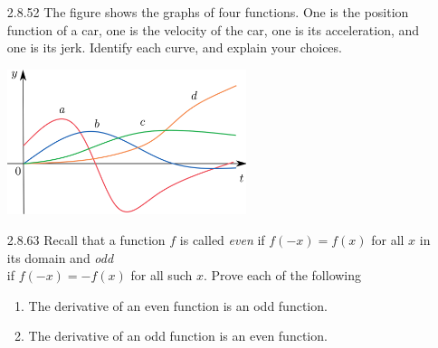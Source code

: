\documentclass{article}
\begin{document}
\begin{enumerate}
    \newpage

    \item[2.8.52]
        The figure shows the graphs of four functions.
        One is the position function of a car, one is the velocity of the car, one is its acceleration, and one is its jerk.
        Identify each curve, and explain your choices.

        \begin{center}
            \includegraphics[width=7cm]{./png/2.8.52.png}
        \end{center}

    \vspace{6cm}

    \item[2.8.63]
        Recall that a function $f$ is called \textit{even} if $f(-x)=f(x)$ for all $x$ in its domain
        and \textit{odd} \\ if $f(-x)=-f(x)$ for all such $x$. Prove each of the following

        \begin{enumerate}
            \item The derivative of an even function is an odd function.
            \item The derivative of an odd function is an even function.
        \end{enumerate}


\end{enumerate}
\end{document}
